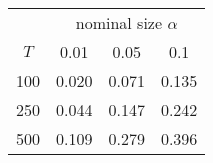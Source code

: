 % 
\begin{tabular}{cccc}
  \hline
  & \multicolumn{3}{c}{nominal size $\alpha$} \\
 $T$ & 0.01 & 0.05 & 0.1 \\
 \hline
100 & 0.020 & 0.071 & 0.135 \\ 
  250 & 0.044 & 0.147 & 0.242 \\ 
  500 & 0.109 & 0.279 & 0.396 \\ 
   \hline
\end{tabular}
